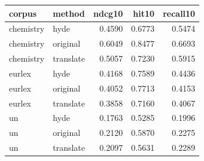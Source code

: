 \begin{tabular}{llrrr}
\toprule
corpus & method & ndcg10 & hit10 & recall10 \\
\midrule
chemistry & hyde & 0.4590 & 0.6773 & 0.5474 \\
chemistry & original & 0.6049 & 0.8477 & 0.6693 \\
chemistry & translate & 0.5057 & 0.7230 & 0.5915 \\
eurlex & hyde & 0.4168 & 0.7589 & 0.4436 \\
eurlex & original & 0.4052 & 0.7713 & 0.4153 \\
eurlex & translate & 0.3858 & 0.7160 & 0.4067 \\
un & hyde & 0.1763 & 0.5285 & 0.1996 \\
un & original & 0.2120 & 0.5870 & 0.2275 \\
un & translate & 0.2097 & 0.5631 & 0.2289 \\
\bottomrule
\end{tabular}
